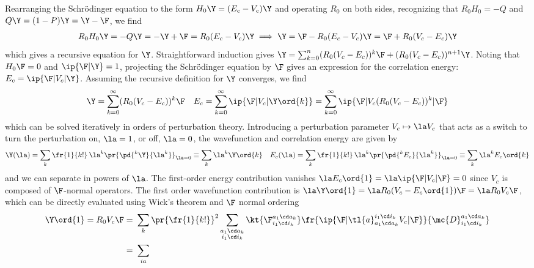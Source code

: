 \documentclass[11pt,fleqn]{article}
\numberwithin{equation}{section}
\begin{document}
\begin{dfn}
Rearranging the Schr\"odinger equation to the form
$
  H_0\Y
=
  (E_c - V_c)\Y
$
and operating $R_0$ on both sides, recognizing that $R_0H_0=-Q$ and $Q\Y=(1-P)\Y=\Y-\F$, we find
\begin{align*}
  R_0H_0\Y
=
-
  Q\Y
=
-
  \Y
+
  \F
=
  R_0
  (E_c - V_c)
  \Y
\implies
  \Y
=
  \F
-
  R_0
  (E_c - V_c)
  \Y
=
  \F
+
  R_0
  (V_c - E_c)
  \Y
\end{align*}
which gives a recursive equation for $\Y$.
Straightforward induction gives
$
  \Y
=
  \sum_{k=0}^n
  (R_0(V_c - E_c))^k\F
+
  (R_0(V_c - E_c))^{n+1}\Y
$.
Noting that $H_0\F=0$ and $\ip{\F|\Y}=1$, projecting the Schr\"odinger equation by $\F$ gives an expression for the correlation energy: $E_c=\ip{\F|V_c|\Y}$.
Assuming the recursive definition for $\Y$ converges, we find
\begin{align}\label{eq:rspt-equations-form-1}
  \Y
=
  \sum_{k=0}^{\infty}
  (R_0(V_c - E_c))^k\F
&&
  E_c
=
  \sum_{k=0}^{\infty}
  \ip{\F|V_c|\Y\ord{k}}
=
  \sum_{k=0}^{\infty}
  \ip{\F|V_c(R_0(V_c - E_c))^k|\F}
\end{align}
which can be solved iteratively in orders of perturbation theory.
Introducing a perturbation parameter $V_c\mapsto \la V_c$ that acts as a switch to turn the perturbation on, $\la=1$, or off, $\la=0$, the wavefunction and correlation energy are given by
\begin{align*}
  \Y(\la)
=
  \sum_k
  \fr{1}{k!}\,\la^k\pr{\pd{^k\Y}{\la^k}}_{\la=0}
\equiv
  \sum_k
  \la^k \Y\ord{k}
&&
  E_c(\la)
=
  \sum_k
  \fr{1}{k!}\,\la^k\pr{\pd{^kE_c}{\la^k}}_{\la=0}
\equiv
  \sum_k
  \la^k
  E_c\ord{k}
\end{align*}
and we can separate  in powers of $\la$.
The first-order energy contribution vanishes
$\la E_c\ord{1}=\la\ip{\F|V_c|\F}=0$
since $V_c$ is composed of $\F$-normal operators.
The first order wavefunction contribution is
$
  \la
  \Y\ord{1}
=
  \la
  R_0
  (V_c - E_c\ord{1})\F
=
  \la
  R_0
  V_c
  \F
$,
which can be directly evaluated using Wick's theorem and $\F$ normal ordering
\begin{align*}
  \Y\ord{1}
=
  R_0
  V_c
  \F
=&\
  \sum_k
  \pr{\fr{1}{k!}}^2
  \sum_{\substack{a_1\cd a_k\\i_1\cd i_k}}
  \kt{\F_{i_1\cd i_k}^{a_1\cd a_k}}
  \fr{
    \ip{\F|\tl{a}^{i_1\cd i_k}_{a_1\cd a_k}V_c|\F}
  }{
    \mc{D}_{i_1\cd i_k}^{a_1\cd a_k}
  }
\\=&\
  \sum_{ia}

\end{align*}
\end{dfn}
\end{document}

